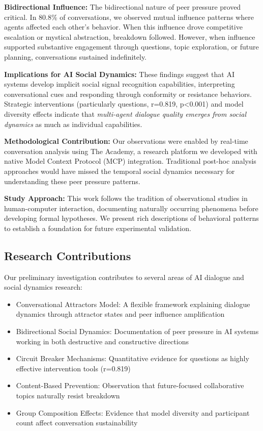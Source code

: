 \documentclass[11pt,letterpaper]{article}
\newcommand{\theacademy}{The Academy}
\newcommand{\exponedataBidirectionalPercentage}{80.8\%}
\newcommand{\exponedataQuestionCorrelation}{0.819}
\newcommand{\exponedataQuestionPValue}{p\textless0.001}
\begin{document}
\textbf{Bidirectional Influence:} The bidirectional nature of peer pressure proved critical. In \exponedataBidirectionalPercentage{} of conversations, we observed mutual influence patterns where agents affected each other's behavior. When this influence drove competitive escalation or mystical abstraction, breakdown followed. However, when influence supported substantive engagement through questions, topic exploration, or future planning, conversations sustained indefinitely.

\textbf{Implications for AI Social Dynamics:} These findings suggest that AI systems develop implicit social signal recognition capabilities, interpreting conversational cues and responding through conformity or resistance behaviors. Strategic interventions (particularly questions, r=\exponedataQuestionCorrelation{}, \exponedataQuestionPValue{}) and model diversity effects indicate that \textit{multi-agent dialogue quality emerges from social dynamics} as much as individual capabilities.

\textbf{Methodological Contribution:} Our observations were enabled by real-time conversation analysis using \theacademy{}, a research platform we developed with native Model Context Protocol (MCP) integration. Traditional post-hoc analysis approaches would have missed the temporal social dynamics necessary for understanding these peer pressure patterns.

\textbf{Study Approach:} This work follows the tradition of observational studies in human-computer interaction, documenting naturally occurring phenomena before developing formal hypotheses. We present rich descriptions of behavioral patterns to establish a foundation for future experimental validation.

\subsection{Research Contributions}

Our preliminary investigation contributes to several areas of AI dialogue and social dynamics research:

\begin{itemize}
    \item Conversational Attractors Model: A flexible framework explaining dialogue dynamics through attractor states and peer influence amplification
    \item Bidirectional Social Dynamics: Documentation of peer pressure in AI systems working in both destructive and constructive directions
    \item Circuit Breaker Mechanisms: Quantitative evidence for questions as highly effective intervention tools (r=\exponedataQuestionCorrelation{})
    \item Content-Based Prevention: Observation that future-focused collaborative topics naturally resist breakdown
    \item Group Composition Effects: Evidence that model diversity and participant count affect conversation sustainability
\end{itemize}
\end{document}
